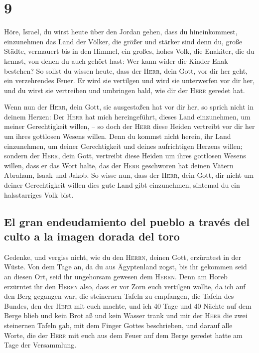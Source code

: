 \hypertarget{section-8}{%
\section{9}\label{section-8}}

 Höre, Israel, du wirst heute über den Jordan gehen, dass
du hineinkommest, einzunehmen das Land der Völker, die größer und
stärker sind denn du, große Städte, vermauert bis in den Himmel,
 ein großes, hohes Volk, die Enakiter, die du kennst, von
denen du auch gehört hast: Wer kann wider die Kinder Enak bestehen?
 So sollst du wissen heute, dass der \textsc{Herr}, dein
Gott, vor dir her geht, ein verzehrendes Feuer. Er wird sie vertilgen
und wird sie unterwerfen vor dir her, und du wirst sie vertreiben und
umbringen bald, wie dir der \textsc{Herr} geredet hat.

 Wenn nun der \textsc{Herr}, dein Gott, sie ausgestoßen
hat vor dir her, so sprich nicht in deinem Herzen: Der \textsc{Herr} hat
mich hereingeführt, dieses Land einzunehmen, um meiner Gerechtigkeit
willen, -- so doch der \textsc{Herr} diese Heiden vertreibt vor dir her
um ihres gottlosen Wesens willen.  Denn du kommst nicht
herein, ihr Land einzunehmen, um deiner Gerechtigkeit und deines
aufrichtigen Herzens willen; sondern der \textsc{Herr}, dein Gott,
vertreibt diese Heiden um ihres gottlosen Wesens willen, dass er das
Wort halte, das der \textsc{Herr} geschworen hat deinen Vätern Abraham,
Isaak und Jakob.  So wisse nun, dass der \textsc{Herr},
dein Gott, dir nicht um deiner Gerechtigkeit willen dies gute Land gibt
einzunehmen, sintemal du ein halsstarriges Volk bist.

\hypertarget{el-gran-endeudamiento-del-pueblo-a-travuxe9s-del-culto-a-la-imagen-dorada-del-toro}{%
\subsection{El gran endeudamiento del pueblo a través del culto a la
imagen dorada del
toro}\label{el-gran-endeudamiento-del-pueblo-a-travuxe9s-del-culto-a-la-imagen-dorada-del-toro}}

 Gedenke, und vergiss nicht, wie du den \textsc{Herrn},
deinen Gott, erzürntest in der Wüste. Von dem Tage an, da du aus
Ägyptenland zogst, bis ihr gekommen seid an diesen Ort, seid ihr
ungehorsam gewesen dem \textsc{Herrn}.  Denn am Horeb
erzürntet ihr den \textsc{Herrn} also, dass er vor Zorn euch vertilgen
wollte,  da ich auf den Berg gegangen war, die steinernen
Tafeln zu empfangen, die Tafeln des Bundes, den der \textsc{Herr} mit
euch machte, und ich 40 Tage und 40 Nächte auf dem Berge blieb und kein
Brot aß und kein Wasser trank  und mir der \textsc{Herr}
die zwei steinernen Tafeln gab, mit dem Finger Gottes beschrieben, und
darauf alle Worte, die der \textsc{Herr} mit euch aus dem Feuer auf dem
Berge geredet hatte am Tage der Versammlung.

